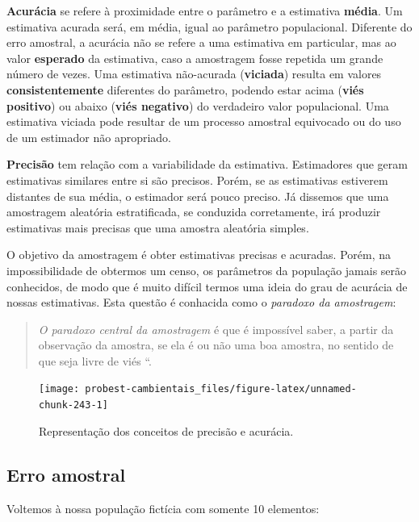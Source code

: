 \documentclass[
]{book}
\begin{document}
\textbf{Acurácia} se refere à proximidade entre o parâmetro e a estimativa \textbf{média}. Um estimativa acurada será, em média, igual ao parâmetro populacional. Diferente do erro amostral, a acurácia não se refere a uma estimativa em particular, mas ao valor \textbf{esperado} da estimativa, caso a amostragem fosse repetida um grande número de vezes.
Uma estimativa não-acurada (\textbf{viciada}) resulta em valores \textbf{consistentemente} diferentes do parâmetro, podendo estar acima (\textbf{viés positivo}) ou abaixo (\textbf{viés negativo}) do verdadeiro valor populacional. Uma estimativa viciada pode resultar de um processo amostral equivocado ou do uso de um estimador não apropriado.

\textbf{Precisão} tem relação com a variabilidade da estimativa. Estimadores que geram estimativas similares entre si são precisos. Porém, se as estimativas estiverem distantes de sua média, o estimador será pouco preciso. Já dissemos que uma amostragem aleatória estratificada, se conduzida corretamente, irá produzir estimativas mais precisas que uma amostra aleatória simples.

O objetivo da amostragem é obter estimativas precisas e acuradas. Porém, na impossibilidade de obtermos um censo, os parâmetros da população jamais serão conhecidos, de modo que é muito difícil termos uma ideia do grau de acurácia de nossas estimativas. Esta questão é conhacida como o \emph{paradoxo da amostragem}:

\begin{quote}
\emph{O paradoxo central da amostragem} é que é impossível saber, a partir da observação da amostra, se ela é ou não uma boa amostra, no sentido de que seja livre de viés \citep{stuart1984ideas}``.
\end{quote}

\begin{figure}

{\centering \texttt{[image: probest-cambientais\_files/figure-latex/unnamed-chunk-243-1]} 

}

\caption{Representação dos conceitos de precisão e acurácia.}\label{fig:unnamed-chunk-243}
\end{figure}

\hypertarget{erro-amostral}{%
\subsection{Erro amostral}\label{erro-amostral}}

Voltemos à nossa população fictícia com somente 10 elementos:
\end{document}
